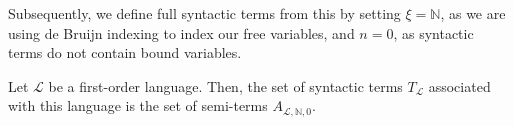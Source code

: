 Subsequently, we define full syntactic terms from this by setting $\xi = \mathbb{N}$, as we are using de Bruijn indexing to index our free variables, and $n = 0$, as syntactic terms do not contain bound variables.

\begin{definition}\label{def:syntacticterm}
    \leanok
    Let $\mathcal{L}$ be a first-order language. Then, the set of syntactic terms $T_{\mathcal{L}}$ associated with this language is the set of semi-terms $A_{\mathcal{L},\mathbb{N},0}$. 
\end{definition}



